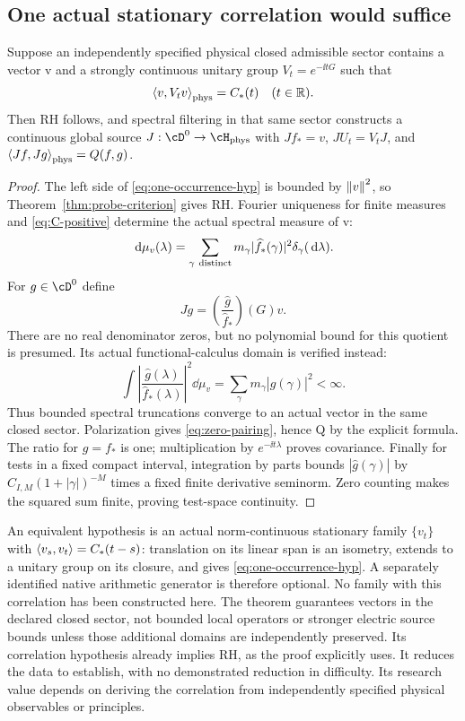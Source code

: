 \subsection{One actual stationary correlation would suffice}
\begin{theorem}\label{thm:one-occurrence}
Suppose an independently specified physical closed
admissible sector contains a vector v and a strongly
continuous unitary group $V_t=e^{-\ii tG}$ such that
\begin{equation}\label{eq:one-occurrence-hyp}
\left\langle v,V_tv\right\rangle_{\rm phys}=C_*(t)\quad(t\in\mathbb R).
\end{equation}
Then RH follows, and spectral filtering in that same
sector constructs a continuous global source
$J:\cD^0\to\cH_{\rm phys}$ with
$Jf_*=v$, $JU_t=V_tJ$, and
$\left\langle Jf,Jg\right\rangle_{\rm phys}=Q(f,g)$.
\end{theorem}
\begin{proof}
The left side of \eqref{eq:one-occurrence-hyp} is bounded
by $\left\lVert v\right\rVert^2$, so Theorem~\ref{thm:probe-criterion} gives
RH. Fourier uniqueness for finite measures and
\eqref{eq:C-positive} determine the actual spectral
measure of v:
\begin{equation}
\,\mathrm d\mu_v(\lambda)=
\sum_{\gamma\ {\rm distinct}}
m_\gamma|\widehat f_*(\gamma)|^2\delta_\gamma(\,\mathrm d\lambda).
\end{equation}
For $g\in\cD^0$ define
\begin{equation}\label{eq:filter-source}
Jg=\left(\frac{\widehat g}{\widehat f_*}\right)(G)v .
\end{equation}
There are no real denominator zeros, but no polynomial
bound for this quotient is presumed. Its actual
functional-calculus domain is verified instead:
\[
\int\left|\frac{\widehat g(\lambda)}
                    {\widehat f_*(\lambda)}\right|^2\dd\mu_v
=\sum_\gamma m_\gamma|\widehat g(\gamma)|^2<\infty.
\]
Thus bounded spectral truncations converge to an actual
vector in the same closed sector. Polarization gives
\eqref{eq:zero-pairing}, hence Q by the explicit formula.
The ratio for $g=f_*$ is one; multiplication by
$e^{-\ii t\lambda}$ proves covariance. Finally for tests
in a fixed compact interval, integration by parts bounds
$|\widehat g(\gamma)|$ by
$C_{I,M}(1+|\gamma|)^{-M}$ times a fixed finite derivative
seminorm. Zero counting makes the squared sum finite,
proving test-space continuity.
\end{proof}
An equivalent hypothesis is an actual norm-continuous
stationary family $\{v_t\}$ with
$\left\langle v_s,v_t\right\rangle=C_*(t-s)$: translation on its linear
span is an isometry, extends to a unitary group on its
closure, and gives \eqref{eq:one-occurrence-hyp}.
A separately identified native arithmetic generator is
therefore optional. No family with this correlation has
been constructed here. The theorem guarantees vectors
in the declared closed sector, not bounded local
operators or stronger electric source bounds unless
those additional domains are independently preserved.
Its correlation hypothesis already implies RH, as the proof explicitly
uses. It reduces the data to establish, with no demonstrated reduction
in difficulty. Its research value depends on deriving the correlation
from independently specified physical observables or principles.
